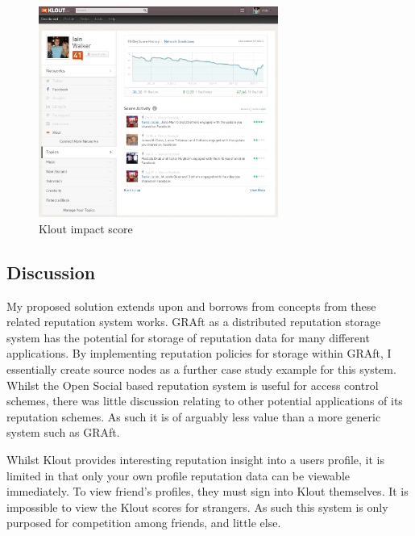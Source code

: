 \begin{figure}[h!]
\centering
\includegraphics[width=0.7\textwidth]{Images/klout.png}
\caption{Klout impact score}
\end{figure}

\subsection{Discussion}

My proposed solution extends upon and borrows from concepts from these related reputation system works. GRAft as a distributed reputation storage system has the potential for storage of reputation data for many different applications. By implementing reputation policies for storage within GRAft, I essentially create source nodes as a further case study example for this system. Whilst the Open Social based reputation system is useful for access control schemes, there was little discussion relating to other potential applications of its reputation schemes. As such it is of arguably less value than a more generic system such as GRAft. 

Whilst Klout provides interesting reputation insight into a users profile, it is limited in that only your own profile reputation data can be viewable immediately. To view friend's profiles, they must sign into Klout themselves. It is impossible to view the Klout scores for strangers. As such this system is only purposed for competition among friends, and little else. 





